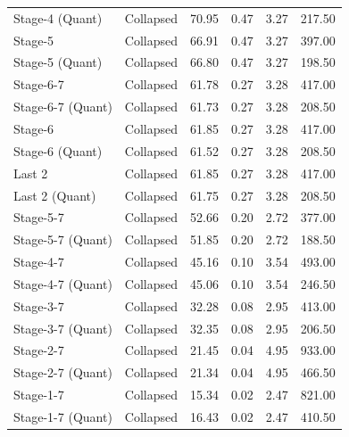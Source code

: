 \begin{table}
\begin{tabular}{llrrrr}
Stage-4
(Quant) & Collapsed & 70.95 & 0.47 & 3.27 & 217.50 \\
Stage-5 & Collapsed & 66.91 & 0.47 & 3.27 & 397.00 \\
Stage-5
(Quant) & Collapsed & 66.80 & 0.47 & 3.27 & 198.50 \\
Stage-6-7 & Collapsed & 61.78 & 0.27 & 3.28 & 417.00 \\
Stage-6-7
(Quant) & Collapsed & 61.73 & 0.27 & 3.28 & 208.50 \\
Stage-6 & Collapsed & 61.85 & 0.27 & 3.28 & 417.00 \\
Stage-6
(Quant) & Collapsed & 61.52 & 0.27 & 3.28 & 208.50 \\
Last 2 & Collapsed & 61.85 & 0.27 & 3.28 & 417.00 \\
Last 2
(Quant) & Collapsed & 61.75 & 0.27 & 3.28 & 208.50 \\
Stage-5-7 & Collapsed & 52.66 & 0.20 & 2.72 & 377.00 \\
Stage-5-7
(Quant) & Collapsed & 51.85 & 0.20 & 2.72 & 188.50 \\
Stage-4-7 & Collapsed & 45.16 & 0.10 & 3.54 & 493.00 \\
Stage-4-7
(Quant) & Collapsed & 45.06 & 0.10 & 3.54 & 246.50 \\
Stage-3-7 & Collapsed & 32.28 & 0.08 & 2.95 & 413.00 \\
Stage-3-7
(Quant) & Collapsed & 32.35 & 0.08 & 2.95 & 206.50 \\
Stage-2-7 & Collapsed & 21.45 & 0.04 & 4.95 & 933.00 \\
Stage-2-7
(Quant) & Collapsed & 21.34 & 0.04 & 4.95 & 466.50 \\
Stage-1-7 & Collapsed & 15.34 & 0.02 & 2.47 & 821.00 \\
Stage-1-7
(Quant) & Collapsed & 16.43 & 0.02 & 2.47 & 410.50 \\
\bottomrule
\end{tabular}
\end{table}
